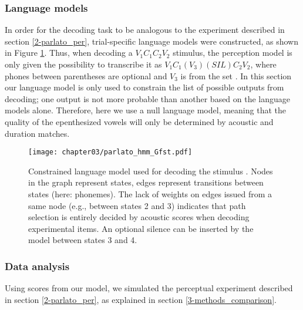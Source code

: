 \subsubsection{Language models}
In order for the decoding task to be analogous to the experiment described in section \ref{2-parlato_per}, trial-specific language models were constructed, as shown in Figure \ref{fig:parlato_G}. Thus, when decoding a $V_{1}C_{1}C_{2}V_{2}$ stimulus, the perception model is only given the possibility to transcribe it as $V_{1}C_{1}(V_{3})(SIL)C_{2}V_{2}$, where phones between parentheses are optional and $V_{3}$ is from the set . In this section our language model is only used to constrain the list of possible outputs from decoding; one output is not more probable than another based on the language models alone. Therefore, here we use a null language model, meaning that the quality of the epenthesized vowels will only be determined by acoustic and duration matches.

\begin{figure}[htb]
\centering
\texttt{[image: chapter03/parlato\_hmm\_Gfst.pdf]}
\caption{Constrained language model used for decoding the stimulus . Nodes in the graph represent states, edges represent transitions between states (here: phonemes). The lack of weights on edges issued from a same node (e.g., between states 2 and 3) indicates that path selection is entirely decided by acoustic scores when decoding experimental items. An optional silence can be inserted by the model between states 3 and 4.}
\label{fig:parlato_G}
\end{figure}

\subsubsection{Data analysis}
Using scores from our model, we simulated the perceptual experiment described in section \ref{2-parlato_per}, as explained in section \ref{3-methods_comparison}. %

